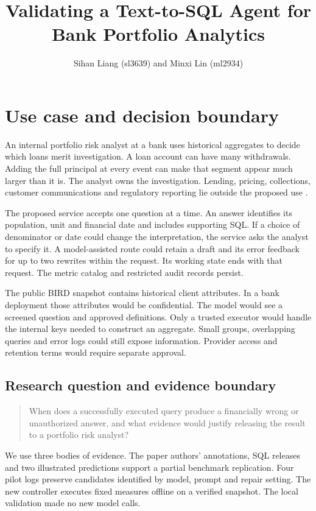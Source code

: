 \documentclass[11pt,a4paper,onecolumn,oneside]{rho-class/rho}
\title{Validating a Text-to-SQL Agent for Bank Portfolio Analytics}
\author[a]{Sihan Liang (sl3639) and Minxi Lin (ml2934)}
\affil[a]{School of Operations Research and Information Engineering, Cornell University}
\begin{document}
\maketitle
\thispagestyle{firststyle}



\section{Use case and decision boundary}

\label{sec:s1}

An internal portfolio risk analyst at a bank uses historical aggregates to decide which loans merit investigation. A loan account can have many withdrawals. Adding the full principal at every event can make that segment appear much larger than it is. The analyst owns the investigation. Lending, pricing, collections, customer communications and regulatory reporting lie outside the proposed use \citep{course}.

The proposed service accepts one question at a time. An answer identifies its population, unit and financial date and includes supporting SQL. If a choice of denominator or date could change the interpretation, the service asks the analyst to specify it. A model-assisted route could retain a draft and its error feedback for up to two rewrites within the request. Its working state ends with that request. The metric catalog and restricted audit records persist.

The public BIRD snapshot contains historical client attributes. In a bank deployment those attributes would be confidential. The model would see a screened question and approved definitions. Only a trusted executor would handle the internal keys needed to construct an aggregate. Small groups, overlapping queries and error logs could still expose information. Provider access and retention terms would require separate approval.

\subsection{Research question and evidence boundary}
\begin{quote}
When does a successfully executed query produce a financially wrong or unauthorized answer, and what evidence would justify releasing the result to a portfolio risk analyst?
\end{quote}
We use three bodies of evidence. The paper authors' annotations, SQL releases and two illustrated predictions support a partial benchmark replication. Four pilot logs preserve candidates identified by model, prompt and repair setting. The new controller executes fixed measures offline on a verified snapshot. The local validation made no new model calls.
\end{document}
